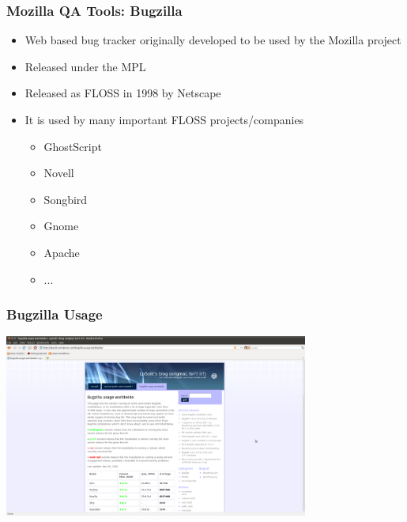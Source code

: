 \documentclass{beamer}
\begin{document}
\begin{frame}
 \frametitle{Mozilla QA Tools: Bugzilla}
 \begin{itemize}
 \item Web based bug tracker originally developed to be used by the Mozilla project
 \item Released under the MPL
 \item Released as FLOSS in 1998 by Netscape
 \item It is used by many important FLOSS projects/companies
    \begin{itemize}
    \item GhostScript
    \item Novell
    \item Songbird
    \item Gnome
    \item Apache
    \item ...
    \end{itemize}
 \end{itemize}
\end{frame}

\begin{frame}
\frametitle{Bugzilla Usage}
\begin{center}
 \includegraphics[height=6cm]{figs/Bugzilla_usage_worldwide.png}
\begin{figure}
\end{figure}
\end{center}
\end{frame}

\end{document}
